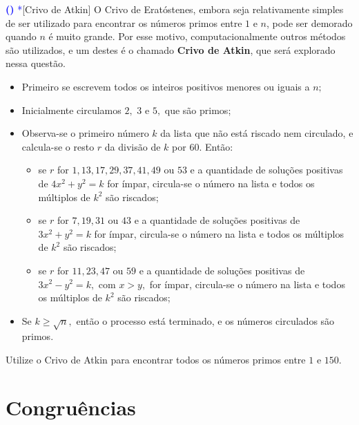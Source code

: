 \documentclass[12pt, a4paper]{article}
\newcounter{exercicio}[section]
\newenvironment{exercicio}[1][]{\refstepcounter{exercicio}\par\medskip
 \textcolor{blue}{\bf(\theexercicio)} \rmfamily}{\medskip }
\begin{document}
\begin{exercicio}\textcolor{Blue}{*}\textsf{[Crivo de Atkin]}
O Crivo de Eratóstenes, embora seja relativamente simples de ser utilizado para encontrar os números primos entre $1$ e $n$, pode ser demorado quando $n$ é muito grande. Por esse motivo, computacionalmente outros métodos são utilizados, e um destes é o chamado \textbf{Crivo de Atkin}, que será explorado nessa questão.

\begin{itemize}
    \item Primeiro se escrevem todos os inteiros positivos menores ou iguais a $n;$
    \item Inicialmente circulamos $2,$ $3$ e $5,$ que são primos;
    \item Observa-se o primeiro número $k$ da lista que não está riscado nem circulado, e calcula-se o resto $r$ da divisão de $k$ por $60.$ Então:
    \begin{itemize}
        \item se $r$ for $1, 13, 17, 29, 37, 41, 49$ ou $53$ e a quantidade de soluções positivas de $4x^2 +y^2 = k$ for ímpar, circula-se o número na lista e todos os múltiplos de $k^2$ são riscados;
        \item se $r$ for $7, 19, 31$ ou $43$ e a quantidade de soluções positivas de $3x^2 +y^2 = k$ for ímpar, circula-se o número na lista e todos os múltiplos de $k^2$  são riscados;
        \item se $r$ for $11, 23, 47$ ou $59$ e a quantidade de soluções positivas de $3x^2 -y^2 = k,$ com $x > y,$ for ímpar, circula-se o número na lista e todos os múltiplos de $k^2$  são riscados;
    \end{itemize}
    \item Se $k \ge \sqrt{n},$ então o processo está terminado, e os números circulados são primos.
\end{itemize}
Utilize o Crivo de Atkin para encontrar todos os números primos entre $1$ e $150.$
\end{exercicio}
\begin{solution}

\end{solution}
\section{  Congruências }
\end{document}
